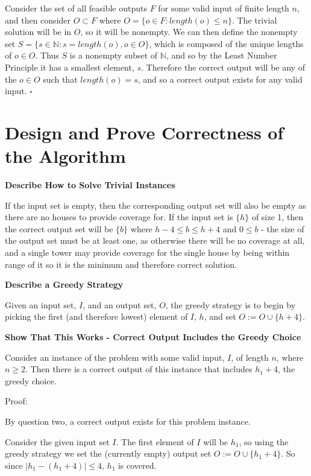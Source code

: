 \documentclass{article}
\begin{document}
Consider the set of all feasible outputs $F$ for some valid input of
finite length $n$, and then consider $O \subset F$ where $O = \{o \in F :
length(o) \leq n\}$. The trivial solution will be in $O$, so it will be
nonempty. We can then define the nonempty set $S = \{s \in \mathbb{N} : s =
length(o), o \in O\}$, which is composed of the unique lengths of $o \in O$.
Thus $S$ is a nonempty subset of $\mathbb{N}$, and so by the Least Number
Principle it has a
smallest element, $s$. Therefore the correct output will be any of the $o \in O$
such that $length(o) = s$, and so a correct output exists for any valid input.
$\square$

\section{Design and Prove Correctness of the Algorithm}

\textbf{Describe How to Solve Trivial Instances}

If the input set is empty, then the corresponding output set will also be empty
as there are no houses to provide coverage for. If the input set is $\{h\}$ of
size 1, then the correct output set will be $\{b\}$ where $h-4 \leq b \leq h+4$
and $0 \leq b$ - the size of the output set must be at least one, as otherwise
there will be no coverage at all, and a single tower may provide coverage for
the single house by being within range of it so it is the minimum and therefore
correct solution.

\textbf{Describe a Greedy Strategy}

Given an input set, $I$, and an output set, $O$, the greedy strategy is to
begin by picking the first (and therefore lowest) element of $I$, $h$, and set
$O := O \cup \{h+4\}$.

\textbf{Show That This Works - Correct Output Includes the Greedy Choice}

Consider an instance of the problem with some valid input, $I$, of length $n$,
where $n \geq 2$. Then there is a correct output of this instance that includes
$h_1+4$, the greedy choice.

Proof: 

By question two, a correct output exists for this problem instance.

Consider the given input set $I$. The first element of $I$ will be $h_1$, so
using the greedy strategy we set the (currently empty) output set $O := O \cup
\{h_1+4\}$. So since $|h_1 - (h_1+4)| \leq 4$, $h_1$ is covered.
\end{document}
